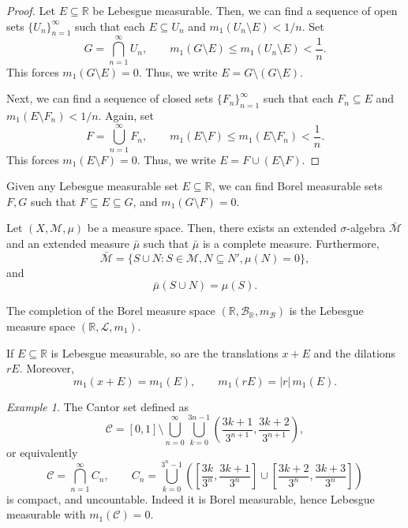 \documentclass[11pt]{article}
\newcommand{\R}{\mathbb{R}}
\newcommand{\M}{\mathcal{M}}
\renewcommand{\L}{\mathcal{L}}
\theoremstyle{definition}
\theoremstyle{remark}
\newtheorem*{example}{Example}
\numberwithin{equation}{section}
\begin{document}
    \begin{proof}
        Let $E \subseteq \R$ be Lebesgue measurable. Then, we can find a sequence of
        open sets $\{U_n\}_{n = 1}^\infty$ such that each $E \subseteq U_n$ and
        $m_1(U_n\setminus E) < 1 / n$. Set \[
            G = \bigcap_{n = 1}^\infty U_n, \qquad
            m_1(G\setminus E) \leq m_1(U_n\setminus E) < \frac{1}{n}.
        \] This forces $m_1(G\setminus E) = 0$. Thus, we write $E = G \setminus
        (G\setminus E)$.

        Next, we can find a sequence of closed sets $\{F_n\}_{n = 1}^\infty$ such
        that each $F_n \subseteq E$ and $m_1(E\setminus F_n) < 1 / n$. Again, set \[
            F = \bigcup_{n = 1}^\infty F_n, \qquad
            m_1(E\setminus F) \leq m_1(E\setminus F_n) < \frac{1}{n}.
        \] This forces $m_1(E\setminus F) = 0$. Thus, we write $E = F\cup(E\setminus
        F)$.
    \end{proof}

    \begin{corollary}
        Given any Lebesgue measurable set $E \subseteq \R$, we can find Borel
        measurable sets $F, G$ such that $F \subseteq E \subseteq G$, and
        $m_1(G\setminus F) = 0$.
    \end{corollary}

    \begin{theorem}
        Let $(X, \M, \mu)$ be a measure space. Then, there exists an extended
        $\sigma$-algebra $\bar{\M}$ and an extended measure $\bar{\mu}$ such that
        $\bar{\mu}$ is a complete measure. Furthermore, \[
            \bar{\M} = \{S \cup N : S \in \M, N \subseteq N', \mu(N) = 0\},
        \] and \[
            \bar{\mu}(S \cup N) = \mu(S).
        \] 
    \end{theorem}

    \begin{theorem}
        The completion of the Borel measure space $(\R, \mathcal{B}_\R,
        m_\mathcal{B})$ is the Lebesgue measure space $(\R, \L, m_1)$.
    \end{theorem}

    
    \begin{lemma}
        If $E \subseteq \R$ is Lebesgue measurable, so are the translations $x + E$
        and the dilations $rE$. Moreover, \[
            m_1(x + E) = m_1(E), \qquad
            m_1(rE) = |r|\,m_1(E).
        \] 
    \end{lemma}

    \begin{example}
        The Cantor set defined as \[
            \mathcal{C} = [0, 1]\setminus \bigcup_{n = 0}^\infty \bigcup_{k = 0}^{3n
            - 1} \left(\frac{3k + 1}{3^{n + 1}}, \frac{3k + 2}{3^{n + 1}}\right),
        \] or equivalently \[
            \mathcal{C} = \bigcap_{n = 1}^\infty C_n, \qquad 
            C_n = \bigcup_{k = 0}^{3^n - 1}\left(\left[\frac{3k}{3^n}, \frac{3k +
            1}{3^n}\right] \cup \left[\frac{3k + 2}{3^n}, \frac{3k +
            3}{3^n}\right]\right)
        \] is compact, and uncountable. Indeed it is Borel measurable, hence Lebesgue
        measurable with $m_1(\mathcal{C}) = 0$.
    \end{example}
\end{document}
